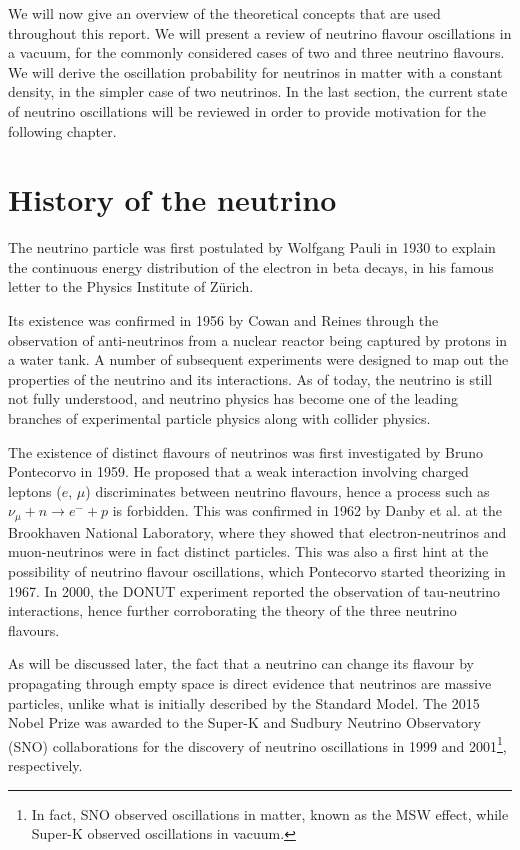 \label{ch:osc}
We will now give an overview of the theoretical concepts that are used
throughout this report. We will present a review of neutrino flavour
oscillations in a vacuum, for the commonly considered cases of two and three
neutrino flavours. We will derive the oscillation probability for
neutrinos in matter with a constant density, in the simpler case of two
neutrinos. In the last section, the current state of neutrino oscillations will
be reviewed in order to provide motivation for the following chapter.


\section{History of the neutrino}
The neutrino particle was first postulated by Wolfgang Pauli in 1930 to explain
the continuous energy distribution of the electron in beta decays, in his
famous letter to the Physics Institute of Zürich\cite{pauli}. 

Its existence was confirmed in 1956 by Cowan and Reines\cite{cowan} through the
observation of anti-neutrinos from a nuclear reactor being captured by protons
in a water tank.
A number of subsequent experiments were designed to map out the properties of
the neutrino and its interactions\cite{zuber}. As of today, the neutrino is
still not fully understood, and neutrino physics has become one of the leading
branches of experimental particle physics along with collider physics. 

The existence of distinct flavours of neutrinos was first investigated by
Bruno Pontecorvo\cite{pontecorvo} in 1959. He proposed that a weak interaction
involving charged leptons ($e$, $\mu$) discriminates between neutrino flavours,
hence a process such as $\nu_\mu + n \rightarrow e^- + p$ is forbidden.
This was confirmed in 1962 by Danby et al.\cite{danby} at the Brookhaven
National Laboratory, where they showed that electron-neutrinos and
muon-neutrinos were in fact distinct particles.
This was also a first hint at the possibility of neutrino flavour oscillations,
which Pontecorvo\cite{pontecorvo-osc} started theorizing in 1967.
In 2000, the DONUT experiment\cite{donut} reported the observation of
tau-neutrino interactions, hence further corroborating the theory of the
three neutrino flavours.

As will be discussed later, the fact that a neutrino can change its flavour by
propagating through empty space is direct evidence that neutrinos are massive
particles, unlike what is initially described by the Standard Model.
The 2015 Nobel Prize was awarded to the Super-K and Sudbury Neutrino
Observatory (SNO) collaborations for the discovery of neutrino oscillations in
1999 and 2001\footnote{In fact, SNO observed oscillations in matter, known as
the MSW effect\cite{smirnov}, while Super-K observed oscillations in
vacuum.}, respectively.

